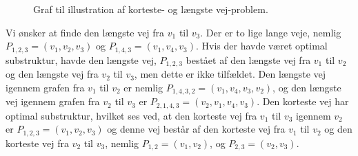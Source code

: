 \begin{exmp} \label{exmp.np}
\begin{figure}[H]
\centering
	\caption{Graf til illustration af korteste- og længste vej-problem.}
	\label{fig.multi}
\end{figure}

Vi ønsker at finde den længste vej fra $v_1$ til $v_3$. Der er to lige lange veje, nemlig $P_{1,2,3}=(v_{1},v_{2},v_{3})$ og $P_{1,4,3}=(v_{1},v_{4},v_{3})$. Hvis der havde været optimal substruktur, havde den længste vej, $P_{1,2,3}$ bestået af den længste vej fra $v_{1}$ til $v_{2}$ og den længste vej fra $v_{2}$ til $v_{3}$, men dette er ikke tilfældet. Den længste vej igennem grafen fra $v_{1}$ til $v_{2}$ er nemlig $P_{1,4,3,2}=(v_{1},v_{4},v_{3},v_{2})$, og den længste vej igennem grafen fra $v_{2}$ til $v_{3}$ er $P_{2,1,4,3}=(v_{2},v_{1},v_{4},v_{3})$. 
Den korteste vej har optimal substruktur, hvilket ses ved, at den korteste vej fra $v_{1}$ til $v_{3}$ igennem $v_{2}$ er $P_{1,2,3}=(v_{1},v_{2},v_{3})$ og denne vej består af den korteste vej fra $v_{1}$ til $v_{2}$ og den korteste vej fra $v_{2}$ til $v_{3}$, nemlig $P_{1,2}=(v_{1},v_{2})$, og $P_{2,3}=(v_{2},v_{3})$. 
\end{exmp}





